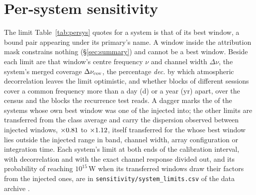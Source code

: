\section{Per-system sensitivity}
\label{app:persys}

The limit Table~\ref{tab:persys} quotes for a system is that of its best
window, a bound pair appearing under its primary's name. A window inside the
attribution mask constrains nothing (\S\ref{sec:summary}) and cannot be a best
window. Beside each limit are that window's centre frequency $\nu$ and channel
width $\Delta\nu$, the system's merged coverage $\Delta\nu_{\rm cov}$, the
percentage \emph{dec.} by which atmospheric decorrelation leaves the limit
optimistic, and whether blocks of different sessions cover a common frequency
more than a day (d) or a year (yr) apart, over the census and the \ZcNRecEB{}
blocks the recurrence test reads. A dagger marks the \SmcNMeasSys{} of the
\NSysALim{} systems whose own best window was one of the \SensNInj{} injected
into; the other \SmcNEstSys{} limits are transferred from the class average
and carry the dispersion observed between injected windows,
$\times0.81$ to $\times1.12$, itself transferred for the
\NgNExtrapSys{} \NgExtrapSysNoun{} whose best window lies outside the injected
range in band, channel width, array configuration or integration time. Each
system's limit at both ends of the calibration interval, with decorrelation
and with the exact channel response divided out, and its probability of
reaching $10^{15}$\,W when its transferred windows draw their factors from the
injected ones, are in \texttt{sensitivity/\allowbreak system\_limits.csv} of
the data archive \citep{SIdeposit}.

